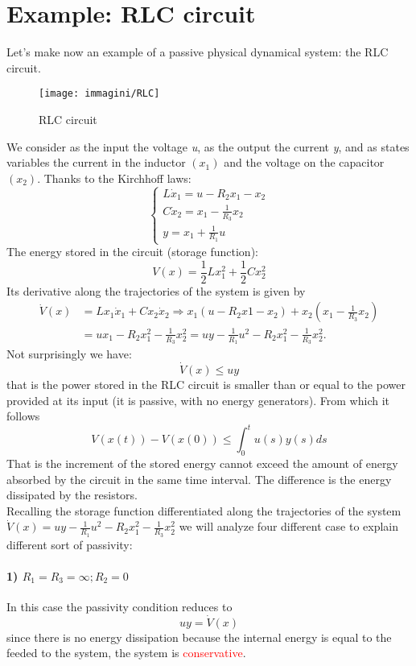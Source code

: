 \section{Example: RLC circuit}
Let's make now an example of a passive physical dynamical system: the RLC circuit.
\begin{figure}[H]
	\centering
	\texttt{[image: immagini/RLC]}
	\caption{RLC circuit}
	\label{fig:rlc}
\end{figure}
We consider as the input the voltage \emph{u}, as the output the current \emph{y}, and as states variables the current in the inductor $(x_1)$ and the voltage on the capacitor $(x_2)$. Thanks to the Kirchhoff laws:
\[
\begin{cases}
	 L\dot{x}_1=u-R_2x_1-x_2\\
	C\dot{x}_2=x_1-\frac{1}{R_3}x_2\\
	y=x_1+\frac{1}{R_1}u
\end{cases}
\]
The energy stored in the circuit (storage function):\[V(x)=\frac{1}{2}Lx_1^2+\frac{1}{2}Cx_2^2\]
Its derivative along the trajectories of the system is given by
\[
\begin{aligned}
	\dot{V}(x)&=Lx_1\dot{x}_1+Cx_2\dot{x}_2\Rightarrow x_1(u-R_2x1-x_2)+x_2(x_1-\frac{1}{R_3}x_2) \\
	&=ux_1-R_2x_1^2-\frac{1}{R_3}x_2^2=uy-\frac{1}{R_1}u^2-R_2x_1^2-\frac{1}{R_3}x_2^2.
\end{aligned}
\]
Not surprisingly we have:
\[
\dot{V}(x)\le uy
\]
that is the power stored in the RLC circuit is smaller than or equal to the power provided at its input (it is passive, with no energy generators). From which it follows \[
V(x(t))-V(x(0))\le\int_{0}^{t}u(s)y(s)ds
\]
That is the increment of the stored energy cannot exceed the amount of energy absorbed by the circuit in the same time interval. The difference is the energy dissipated by the resistors.
\\Recalling the storage function differentiated along the trajectories of the system $\dot{V}(x)=uy-\frac{1}{R_1}u^2-R_2x_1^2-\frac{1}{R_3}x_2^2$ we will analyze four different case to explain different sort of passivity:
\paragraph{1) $R_1=R_3=\infty; R_2=0 $}
In this case the passivity condition reduces to \[uy=\dot{V}(x)\] since there is no energy dissipation because the internal energy is equal to the feeded to the system, the system is \textcolor{red}{conservative}.

